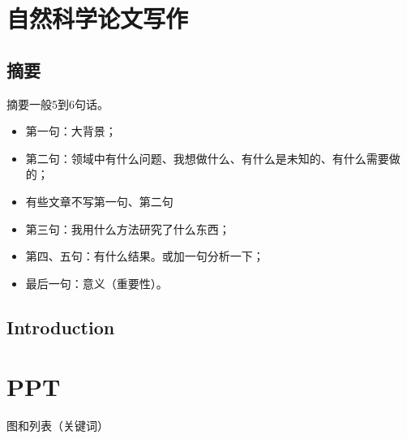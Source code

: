 \section{自然科学论文写作}
\subsection{摘要}
摘要一般5到6句话。
\begin{itemize}
\item 第一句：大背景；
\item 第二句：领域中有什么问题、我想做什么、有什么是未知的、有什么需要做的；
\item 有些文章不写第一句、第二句
\item 第三句：我用什么方法研究了什么东西；
\item 第四、五句：有什么结果。或加一句分析一下；
\item 最后一句：意义（重要性）。
\end{itemize}


\subsection{Introduction}



\section{PPT}
图和列表（关键词）













